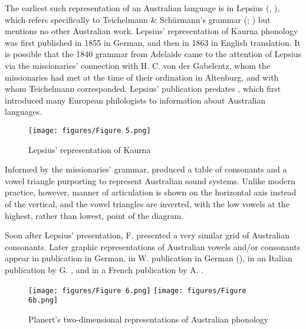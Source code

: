 The earliest such representation of an Australian language is in Lepsius (\citeyear[64]{lepsius_allgemeine_1855}, \citeyear[226]{lepsius_standard_1863}), which refers specifically to Teichelmann \& Schürmann’s grammar (\citeyear{teichelmann_outlines_1840}; ) but mentions no other Australian work. Lepsius’ representation of Kaurna phonology was first published in 1855 in German, and then in 1863 in English translation. It is possible that the 1840 grammar from Adelaide came to the attention of Lepsius via the missionaries’ connection with H. C. von der Gabelentz, whom the missionaries had met at the time of their ordination in Altenburg, and with whom Teichelmann corresponded. Lepsius’ publication predates \citet{bleek_library_1858}, which first introduced many European philologists to information about Australian languages.

\begin{figure}
\texttt{[image: figures/Figure 5.png]}
\caption{Lepsius’ representation of Kaurna \citep[266]{lepsius_standard_1863}}
\label{fig:key:Lepsius}
\end{figure}

Informed by the missionaries’ grammar, \citet[226]{lepsius_standard_1863} produced a table of consonants and a vowel triangle purporting to represent Australian sound systems. Unlike modern practice, however, manner of articulation is shown on the horizontal axis instead of the vertical, and the vowel triangles are inverted, with the low vowels at the highest, rather than lowest, point of the diagram.


Soon after Lepsius’ presentation, F. \citet[245]{muller_reise_1867} presented a very similar grid of Australian consonants. Later graphic representations of Australian vowels and/or consonants appear in  publication in German, in W.  publication in German (), in an Italian publication by G. \citet[1]{gatti_lingua_1930}, and in a French publication by A. \citet[42, 45]{Sommerfelt_1938}. 

\begin{figure}
\texttt{[image: figures/Figure 6.png]}
\texttt{[image: figures/Figure 6b.png]}
\caption{Planert's two-dimensional representations of Australian phonology \citep[551–552]{planert_australische_1907}}
\label{fig:key:Planert}
\end{figure}

